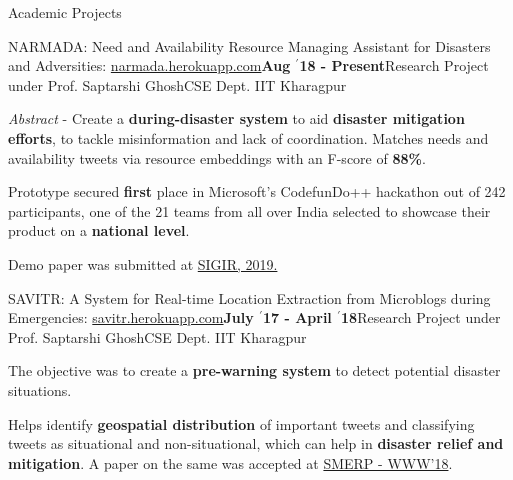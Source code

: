 \documentclass{resume} %
\begin{document}
\begin{rSection}{Academic Projects}
\begin{rSubsection}{ \large NARMADA: Need and Availability Resource Managing Assistant for Disasters and Adversities: \href{http://narmada.herokuapp.com}{narmada.herokuapp.com}}{\textbf{\large Aug $^{\prime}$18 - Present}}{Research Project under Prof. Saptarshi Ghosh}{CSE Dept. IIT Kharagpur}
\item \textit{Abstract} - Create a \textbf{during-disaster system} to aid \textbf{disaster mitigation efforts}, to tackle misinformation and lack of coordination. Matches needs and availability tweets via resource embeddings with an F-score of \textbf{88\%}.
\item Prototype secured \textbf{first} place in Microsoft's CodefunDo++ hackathon out of 242 participants, one of the 21 teams from all over India selected to showcase their product on a \textbf{national level}.
\item Demo paper was submitted at \href{http://sigir.org/sigir2019/}{SIGIR, 2019.}
\end{rSubsection}


\begin{rSubsection}{ \large SAVITR: A System for Real-time Location Extraction from Microblogs during Emergencies: \href{http://savitr.herokuapp.com}{savitr.herokuapp.com}}{\textbf{\large July $^{\prime}$17 - April $^{\prime}$18}}{Research Project under Prof. Saptarshi Ghosh}{CSE Dept. IIT Kharagpur}
\item The objective was to create a \textbf{pre-warning system} to detect potential disaster situations. 
\item Helps identify \textbf{geospatial distribution} of important tweets and classifying tweets as situational and non-situational, which can help in \textbf{disaster relief and mitigation}. A paper on the same was accepted at \href{https://www.cse.iitk.ac.in/users/kripa/smerp2018/}{SMERP - WWW'18}.
\end{rSubsection}


\end{rSection}
\end{document}

